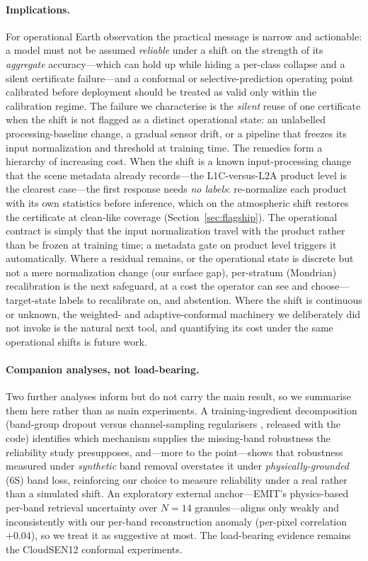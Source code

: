 \documentclass[preprint,3p,times]{elsarticle}
\begin{document}
\paragraph{Implications.} For operational Earth observation the practical message is narrow and actionable: a model must not be assumed \emph{reliable} under a shift on the strength of its \emph{aggregate} accuracy---which can hold up while hiding a per-class collapse and a silent certificate failure---and a conformal or selective-prediction operating point calibrated before deployment should be treated as valid only within the calibration regime. The failure we characterise is the \emph{silent} reuse of one certificate when the shift is not flagged as a distinct operational state: an unlabelled processing-baseline change, a gradual sensor drift, or a pipeline that freezes its input normalization and threshold at training time. The remedies form a hierarchy of increasing cost. When the shift is a known input-processing change that the scene metadata already records---the L1C-versus-L2A product level is the clearest case---the first response needs \emph{no labels}: re-normalize each product with its own statistics before inference, which on the atmospheric shift restores the certificate at clean-like coverage (Section~\ref{sec:flagship}). The operational contract is simply that the input normalization travel with the product rather than be frozen at training time; a metadata gate on product level triggers it automatically. Where a residual remains, or the operational state is discrete but not a mere normalization change (our surface gap), per-stratum (Mondrian) recalibration is the next safeguard, at a cost the operator can see and choose---target-state labels to recalibrate on, and abstention. Where the shift is continuous or unknown, the weighted- and adaptive-conformal machinery we deliberately did not invoke is the natural next tool, and quantifying its cost under the same operational shifts is future work.

\paragraph{Companion analyses, not load-bearing.} Two further analyses inform but do not carry the main result, so we summarise them here rather than as main experiments. A training-ingredient decomposition (band-group dropout versus channel-sampling regularisers \citep{bao2024channelvit,pham2024dichavit}, released with the code) identifies which mechanism supplies the missing-band robustness the reliability study presupposes, and---more to the point---shows that robustness measured under \emph{synthetic} band removal overstates it under \emph{physically-grounded} (6S) band loss, reinforcing our choice to measure reliability under a real rather than a simulated shift. An exploratory external anchor---EMIT's physics-based per-band retrieval uncertainty \citep{green2020emit,thompson2018isofit} over $N=14$ granules---aligns only weakly and inconsistently with our per-band reconstruction anomaly (per-pixel correlation $+0.04$), so we treat it as suggestive at most. The load-bearing evidence remains the CloudSEN12 conformal experiments.
\end{document}
